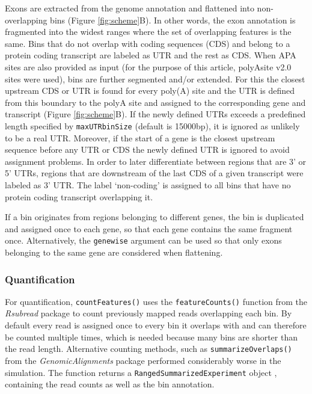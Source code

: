 \documentclass{bmcart}
\begin{document}
Exons are extracted from the genome annotation and flattened into non-overlapping bins (Figure \ref{fig:scheme}B). In other words, the exon annotation is fragmented into the widest ranges where the set of overlapping features is the same. Bins that do not overlap with coding sequences (CDS) and belong to a protein coding transcript are labeled as UTR and the rest as CDS. When APA sites are also provided as input (for the purpose of this article, polyAsite v2.0 sites were used), bins are further segmented and/or extended. For this the closest upstream CDS or UTR is found for every poly(A) site and the UTR is defined from this boundary to the polyA site and assigned to the corresponding gene and transcript (Figure \ref{fig:scheme}B). If the newly defined UTRs exceeds a predefined length specified by \texttt{maxUTRbinSize} (default is 15000bp), it is ignored as unlikely to be a real UTR. Moreover, if the start of a gene is the closest upstream sequence before any UTR or CDS the newly defined UTR is ignored to avoid assignment problems. In order to later differentiate between regions that are 3' or 5' UTRs, regions that are downstream of the last CDS of a given transcript were labeled as 3' UTR. The label `non-coding' is assigned to all bins that have no protein coding transcript overlapping it.

If a bin originates from regions belonging to different genes, the bin is duplicated and assigned once to each gene, so that each gene contains the same fragment once. Alternatively, the \texttt{genewise} argument can be used so that only exons belonging to the same gene are considered when flattening.

\subsubsection{Quantification}

For quantification, \texttt{countFeatures()} uses the \texttt{featureCounts()} function from the \textit{Rsubread} package \cite{Liao2014FeatureCounts:Features} to count previously mapped reads overlapping each bin. By default every read is assigned once to every bin it overlaps with and can therefore be counted multiple times, which is needed because many bins are shorter than the read length. Alternative counting methods, such as \texttt{summarizeOverlaps()} from the \textit{GenomicAlignments} package \cite{Lawrence2013SoftwareRanges} performed considerably worse in the simulation. The function returns a \texttt{RangedSummarizedExperiment} object \cite{Morgan2018SummarizedExperiment:Container}, containing the read counts as well as the bin annotation. 
\end{document}
